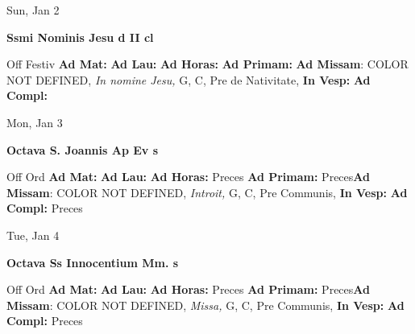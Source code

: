 \documentclass[10pt]{book}
\begin{document}
\begin{center}
\begin{minipage}{3.5in}
\vspace{2em}
\begin{center}Sun, Jan 2
\end{center}
\textbf{ \large Ssmi Nominis Jesu
\textnormal{\normalsize d II cl}}

\begin{justify}Off Festiv
\textbf{Ad Mat: }
\textbf{Ad Lau: }
\textbf{Ad Horas: }
\textbf{Ad Primam: }\textbf{Ad Missam}: COLOR NOT DEFINED, \textit{In nomine Jesu,} G, C, Pre de Nativitate, 
\textbf{In Vesp: }
\textbf{Ad Compl: }
\end{justify}
\end{minipage}
\end{center}

\begin{center}
\begin{minipage}{3.5in}
\vspace{2em}
\begin{center}Mon, Jan 3
\end{center}
\textbf{ \large Octava S. Joannis Ap Ev
\textnormal{\normalsize s}}

\begin{justify}Off Ord
\textbf{Ad Mat: }
\textbf{Ad Lau: }
\textbf{Ad Horas: }Preces
\textbf{Ad Primam: }Preces\textbf{Ad Missam}: COLOR NOT DEFINED, \textit{Introit,} G, C, Pre Communis, 
\textbf{In Vesp: }
\textbf{Ad Compl: }Preces
\end{justify}
\end{minipage}
\end{center}

\begin{center}
\begin{minipage}{3.5in}
\vspace{2em}
\begin{center}Tue, Jan 4
\end{center}
\textbf{ \large Octava Ss Innocentium Mm.
\textnormal{\normalsize s}}

\begin{justify}Off Ord
\textbf{Ad Mat: }
\textbf{Ad Lau: }
\textbf{Ad Horas: }Preces
\textbf{Ad Primam: }Preces\textbf{Ad Missam}: COLOR NOT DEFINED, \textit{Missa,} G, C, Pre Communis, 
\textbf{In Vesp: }
\textbf{Ad Compl: }Preces
\end{justify}
\end{minipage}
\end{center}
\end{document}

